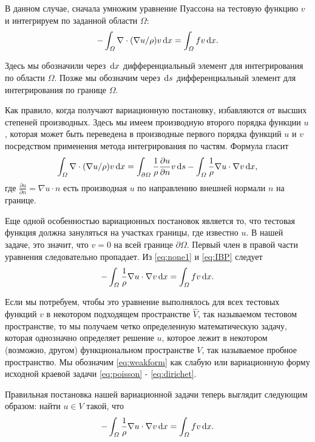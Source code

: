 В данном случае, сначала умножим уравнение Пуассона на тестовую функцию ${v}$ и интегрируем по заданной области ${\Omega}$: 
\begin{equation} \label{eq:none1}
  - \int_\varOmega \nabla \cdot (\nabla u / \rho)v \, \mathrm{d}x 
  = \int_\varOmega f v \, \mathrm{d}x.
\end{equation}

Здесь мы обозначили через ${\, \mathrm{d}x}$ дифференциальный элемент для интегрирования по области ${\Omega}$. Позже мы обозначим через ${\, \mathrm{d}s}$ дифференциальный элемент для интегрирования по границе ${\Omega}$.

Как правило, когда получают вариационную постановку, избавляются от высших степеней производных. Здесь мы имеем производную второго порядка функции ${u}$, которая может быть переведена в производные первого порядка функций ${u}$ и ${v}$ посредством применения метода интегрирования по частям. Формула гласит
\begin{equation} \label{eq:IBP}
  \int_\varOmega \nabla \cdot (\nabla u / \rho)v \, \mathrm{d}x
= \int_{\partial\varOmega} \frac 1 \rho {\partial u\over\partial n}v \, \mathrm{d}s
- \int_\varOmega \frac 1 \rho \nabla u\cdot\nabla v \, \mathrm{d}x,
\end{equation}
где ${\frac{\partial u}{\partial n} = \nabla u \cdot n}$ есть производная ${u}$ по направлению внешней нормали ${n}$ на границе.

Еще одной особенностью вариационных постановок является то, что тестовая функция должна зануляться на участках границы, где известно ${u}$. В нашей задаче, это значит, что ${v = 0}$ на всей границе ${\partial\Omega}$. Первый член в правой части уравнения следовательно пропадает. Из \eqref{eq:none1} и \eqref{eq:IBP} следует
\begin{equation} \label{eq:weakform}
- \int_\varOmega \frac 1 \rho \nabla u\cdot\nabla v \, \mathrm{d}x = \int_\varOmega f v \, \mathrm{d}x.
\end{equation}

Если мы потребуем, чтобы это уравнение выполнялось для всех тестовых функций ${v}$ в некотором подходящем пространстве ${\hat V}$, так называемом тестовом пространстве, то мы получаем четко определенную математическую задачу, которая однозначно определяет решение ${u}$, которое лежит в некотором (возможно, другом) функциональном пространстве ${V}$, так называемое пробное пространство. Мы обозначим \eqref{eq:weakform} как слабую или вариационную форму исходной краевой задачи \eqref{eq:poisson} - \eqref{eq:dirichet}.

Правильная постановка нашей вариационной задачи теперь выглядит следующим образом: найти ${u \in V}$ такой, что
\begin{equation} \label{eq:varprob}
- \int_\varOmega \frac 1 \rho \nabla u\cdot\nabla v \, \mathrm{d}x = \int_\varOmega f v \, \mathrm{d}x.
\end{equation}

